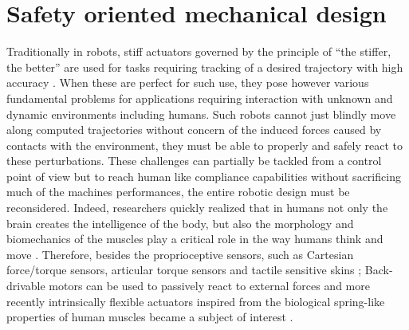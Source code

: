 \section{Safety oriented mechanical design}
Traditionally in robots, stiff actuators governed by the principle of ``the stiffer, the better'' are used for tasks requiring tracking of a desired trajectory with high accuracy \cite{salisbury1991design}. When these are perfect for such use, they pose however various fundamental problems for applications requiring interaction with unknown and dynamic environments including humans. Such robots cannot just blindly move along computed trajectories without concern of the induced forces caused by contacts with the environment, they must be able to properly and safely react to these perturbations. These challenges can partially be tackled  from a control point of view but to reach human like compliance capabilities without sacrificing much of the machines performances, the entire robotic design must be reconsidered. Indeed, researchers quickly realized that in humans not only the brain creates the intelligence of the body, but also the morphology and biomechanics of the muscles play a critical role in the way humans think and move \cite{pfeifer2006body}. Therefore, besides the proprioceptive sensors, such as Cartesian force/torque sensors, articular torque sensors and tactile sensitive skins \cite{Fogale-robotics}; Back-drivable motors can be used to passively react to external forces \cite{townsend1993mechanical} and more recently intrinsically flexible actuators inspired from the biological spring-like properties of human muscles became a subject of interest \cite{burdet2001central}.  
